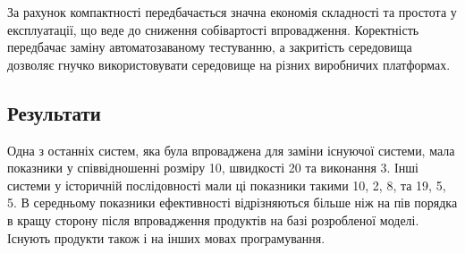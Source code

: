 \documentclass[11pt,oneside]{article}
\begin{document}
   За рахунок компактності передбачається значна економія складності та простота у експлуатації,
   що веде до сниження собівартості впровадження. Коректність передбачає заміну
   автоматозаваному тестуванню, а закритість середовища дозволяє гнучко використовувати
   середовище на різних виробничих платформах.
   \\

\subsection{Результати}
\vspace{0.5cm}
   Одна з останніх систем, яка була впроваджена для заміни існуючої системи, мала
   показники у співвідношенні розміру 10, швидкості 20 та виконання 3. Інші системи
   у історичній послідовності мали ці показники такими 10, 2, 8, та 19, 5, 5.
   В середньому показники ефективності відрізняються більше ніж на пів порядка
   в кращу сторону після впровадження продуктів на базі розробленої моделі.
   Існують продукти також і на інших мовах програмування.
\end{document}
